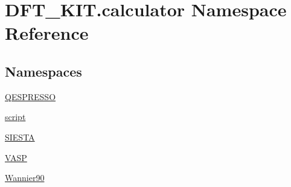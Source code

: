 \hypertarget{namespace_d_f_t___k_i_t_1_1calculator}{\section{D\+F\+T\+\_\+\+K\+I\+T.\+calculator Namespace Reference}
\label{namespace_d_f_t___k_i_t_1_1calculator}
}
\subsection*{Namespaces}
\begin{DoxyCompactItemize}
\item 
 \hyperlink{namespace_d_f_t___k_i_t_1_1calculator_1_1_q_e_s_p_r_e_s_s_o}{Q\+E\+S\+P\+R\+E\+S\+S\+O}
\item 
 \hyperlink{namespace_d_f_t___k_i_t_1_1calculator_1_1script}{script}
\item 
 \hyperlink{namespace_d_f_t___k_i_t_1_1calculator_1_1_s_i_e_s_t_a}{S\+I\+E\+S\+T\+A}
\item 
 \hyperlink{namespace_d_f_t___k_i_t_1_1calculator_1_1_v_a_s_p}{V\+A\+S\+P}
\item 
 \hyperlink{namespace_d_f_t___k_i_t_1_1calculator_1_1_wannier90}{Wannier90}
\end{DoxyCompactItemize}
